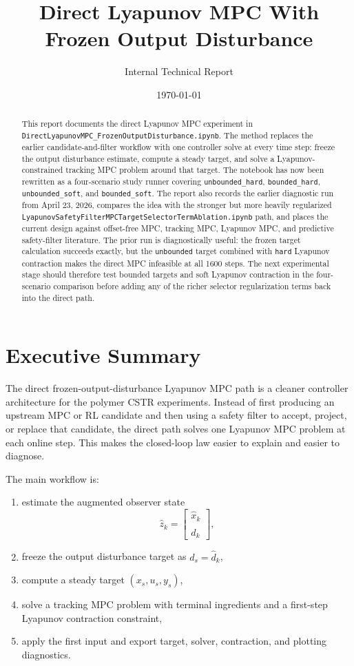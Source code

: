\documentclass[11pt]{article}
\title{Direct Lyapunov MPC With Frozen Output Disturbance}
\author{Internal Technical Report}
\date{\today}
\begin{document}
\maketitle

\begin{abstract}
This report documents the direct Lyapunov MPC experiment in
\texttt{DirectLyapunovMPC\_FrozenOutputDisturbance.ipynb}. The method replaces
the earlier candidate-and-filter workflow with one controller solve at every
time step: freeze the output disturbance estimate, compute a steady target, and
solve a Lyapunov-constrained tracking MPC problem around that target. The
notebook has now been rewritten as a four-scenario study runner covering
\texttt{unbounded\_hard}, \texttt{bounded\_hard},
\texttt{unbounded\_soft}, and \texttt{bounded\_soft}. The report also records
the earlier diagnostic run from April 23, 2026, compares the idea with the
stronger but more heavily regularized
\texttt{LyapunovSafetyFilterMPCTargetSelectorTermAblation.ipynb} path, and
places the current design against offset-free MPC, tracking MPC, Lyapunov MPC,
and predictive safety-filter literature. The prior run is diagnostically useful:
the frozen target calculation succeeds exactly, but the \texttt{unbounded} target
combined with \texttt{hard} Lyapunov contraction makes the direct MPC infeasible
at all 1600 steps. The next experimental stage should therefore test bounded
targets and soft Lyapunov contraction in the four-scenario comparison before
adding any of the richer selector regularization terms back into the direct path.
\end{abstract}

\section{Executive Summary}

The direct frozen-output-disturbance Lyapunov MPC path is a cleaner controller
architecture for the polymer CSTR experiments. Instead of first producing an
upstream MPC or RL candidate and then using a safety filter to accept, project,
or replace that candidate, the direct path solves one Lyapunov MPC problem at
each online step. This makes the closed-loop law easier to explain and easier to
diagnose.

The main workflow is:
\begin{enumerate}[leftmargin=1.5em]
\item estimate the augmented observer state
\[
\hat z_k =
\begin{bmatrix}
\hat x_k \\
\hat d_k
\end{bmatrix},
\]
\item freeze the output disturbance target as \(d_s=\hat d_k\),
\item compute a steady target \((x_s,u_s,y_s)\),
\item solve a tracking MPC problem with terminal ingredients and a first-step
Lyapunov contraction constraint,
\item apply the first input and export target, solver, contraction, and plotting
diagnostics.
\end{enumerate}
\end{document}
